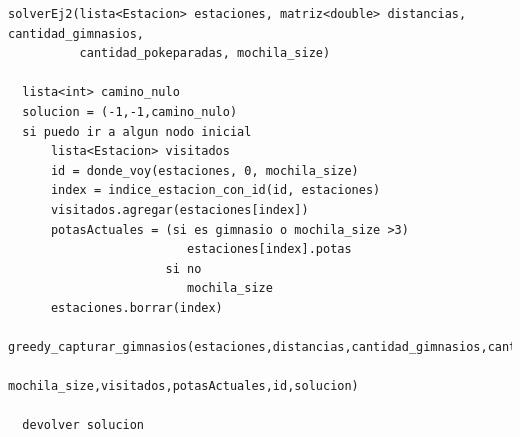            \begin{codesnippet}
            \begin{verbatim}
solverEj2(lista<Estacion> estaciones, matriz<double> distancias, cantidad_gimnasios,
          cantidad_pokeparadas, mochila_size)
  
  lista<int> camino_nulo
  solucion = (-1,-1,camino_nulo)
  si puedo ir a algun nodo inicial
      lista<Estacion> visitados
      id = donde_voy(estaciones, 0, mochila_size)
      index = indice_estacion_con_id(id, estaciones)
      visitados.agregar(estaciones[index])
      potasActuales = (si es gimnasio o mochila_size >3)
                         estaciones[index].potas
                      si no 
                         mochila_size 
      estaciones.borrar(index)
      greedy_capturar_gimnasios(estaciones,distancias,cantidad_gimnasios,cantidad_pokeparadas,
                                mochila_size,visitados,potasActuales,id,solucion)
  
  devolver solucion

            \end{verbatim}
            \end{codesnippet}  

